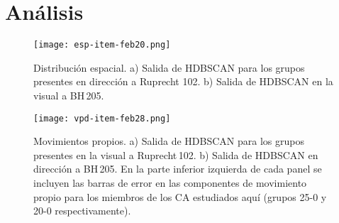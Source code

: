 \documentclass[baaa]{baaa}
\begin{document}



\section{Análisis}\label{sec:guia}

\begin{figure}[!t]
\centering
\texttt{[image: esp-item-feb20.png]}
\caption{Distribuci\'on espacial. a) Salida de {\sc HDBSCAN} para los grupos presentes en direcci\'on a Ruprecht 102. b) Salida de {\sc HDBSCAN} en la visual a BH\,205.}
\label{subgrupos}
\end{figure}

\begin{figure}[!t]
\centering
\texttt{[image: vpd-item-feb28.png]}
\caption{Movimientos propios. a) Salida de {\sc HDBSCAN} para los grupos presentes en la visual a Ruprecht\,102. b) Salida de {\sc HDBSCAN} en direcci\'on a BH\,205. En la parte inferior izquierda de cada panel se incluyen las barras de  error en las componentes de movimiento propio para los miembros de los CA estudiados aquí (grupos 25-0 y 20-0 respectivamente).}
\label{mov}
\end{figure}
\end{document}
